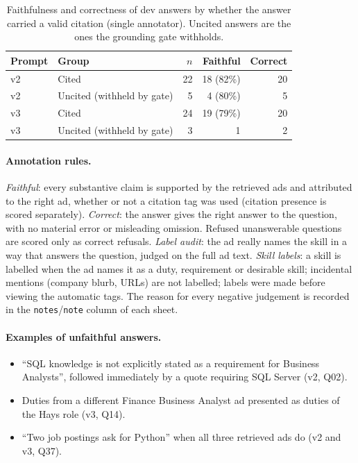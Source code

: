 \begin{table}[H]
\caption{Faithfulness and correctness of dev answers by whether the answer carried a valid citation (single annotator). Uncited answers are the ones the grounding gate withholds.}\label{tab:annot}
\small
\begin{tabular}{llrrr}
\toprule
Prompt & Group & $n$ & Faithful & Correct \\
\midrule
v2 & Cited & 22 & 18 (82\%) & 20 \\
v2 & Uncited (withheld by gate) & 5 & 4 (80\%) & 5 \\
v3 & Cited & 24 & 19 (79\%) & 20 \\
v3 & Uncited (withheld by gate) & 3 & 1 & 2 \\
\bottomrule
\end{tabular}
\end{table}

\paragraph{Annotation rules.} \emph{Faithful}: every substantive claim is supported by the retrieved ads and attributed to the right ad, whether or not a citation tag was used (citation presence is scored separately). \emph{Correct}: the answer gives the right answer to the question, with no material error or misleading omission. Refused unanswerable questions are scored only as correct refusals. \emph{Label audit}: the ad really names the skill in a way that answers the question, judged on the full ad text. \emph{Skill labels}: a skill is labelled when the ad names it as a duty, requirement or desirable skill; incidental mentions (company blurb, URLs) are not labelled; labels were made before viewing the automatic tags. The reason for every negative judgement is recorded in the \texttt{notes}/\texttt{note} column of each sheet.

\paragraph{Examples of unfaithful answers.}
\begin{itemize}
  \item ``SQL knowledge is not explicitly stated as a requirement for Business Analysts'', followed immediately by a quote requiring SQL Server (v2, Q02).
  \item Duties from a different Finance Business Analyst ad presented as duties of the Hays role (v3, Q14).
  \item ``Two job postings ask for Python'' when all three retrieved ads do (v2 and v3, Q37).
\end{itemize}

